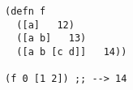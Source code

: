 \begin{lstlisting}[style=reclojureClojure,frame=single]
(defn f
  ([a]   12)
  ([a b]   13)
  ([a b [c d]]   14))

(f 0 [1 2]) ;; --> 14
\end{lstlisting}

